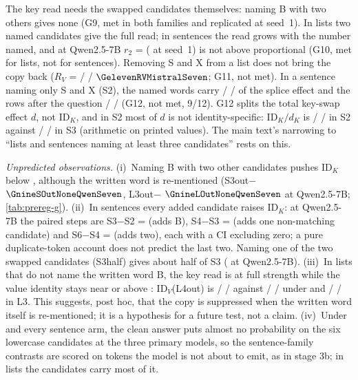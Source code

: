 The key read needs the swapped candidates themselves: naming B with two others gives none (G9, met in both families and replicated at seed~1). In lists two named candidates give the full read; in sentences the read grows with the number named, and at Qwen2.5-7B $r_2$ = \GtenSRtwoQwenSeven{} (\GtenSRtwoSeedoneQwenSeven{} at seed~1) is not above proportional (G10, met for lists, not for sentences). Removing S and X from a list does not bring the copy back ($R_V$ = \GelevenRVQwenSeven{} / \GelevenRVQwenFourteen{} / $\GelevenRVMistralSeven$; G11, not met). In a sentence naming only S and X (S2), the named words carry \GtwelveStwoQwenSeven{} / \GtwelveStwoQwenFourteen{} / \GtwelveStwoMistralSeven{} of the splice effect and the rows after the question \GtwelveRestStwoQwenSeven{} / \GtwelveRestStwoQwenFourteen{} / \GtwelveRestStwoMistralSeven{} (G12, not met, 9/12). G12 splits the total key-swap effect $d$, not $\mathrm{ID}_K$, and in S2 most of $d$ is not identity-specific: $\mathrm{ID}_K/d_K$ is \GcShareStwoQwenSeven{} / \GcShareStwoQwenFourteen{} / \GcShareStwoMistralSeven{} in S2 against \GcShareSthreeQwenSeven{} / \GcShareSthreeQwenFourteen{} / \GcShareSthreeMistralSeven{} in S3 (arithmetic on printed values). The main text's narrowing to ``lists and sentences naming at least three candidates'' rests on this.

\emph{Unpredicted observations.} (i)~Naming B with two other candidates pushes $\mathrm{ID}_K$ below \fmtNone{}, although the written word is re-mentioned (S3out$-$\fmtNone{} $\GnineSOutNoneQwenSeven$, L3out$-$\fmtNone{} $\GnineLOutNoneQwenSeven$ at Qwen2.5-7B; \cref{tab:prereg-g}). (ii)~In sentences every added candidate raises $\mathrm{ID}_K$: at Qwen2.5-7B the paired steps are S3$-$S2 = \GtenSStepThreeTwoQwenSeven{} (adds B), S4$-$S3 = \GtenSStepFourThreeQwenSeven{} (adds one non-matching candidate) and S6$-$S4 = \GtenSStepSixFourQwenSeven{} (adds two), each with a CI excluding zero; a pure duplicate-token account does not predict the last two. Naming one of the two swapped candidates (S3half) gives about half of S3 (\GcHalfQwenSeven{} at Qwen2.5-7B). (iii)~In lists that do not name the written word B, the key read is at full strength while the value identity stays near or above \fmtNone{}: $\mathrm{ID}_V$(L4out) is \GcIDVLfouroutQwenSeven{} / \GcIDVLfouroutQwenFourteen{} / \GcIDVLfouroutMistralSeven{} against \GcIDVNoneQwenSeven{} / \GcIDVNoneQwenFourteen{} / \GcIDVNoneMistralSeven{} under \fmtNone{} and \GcIDVLthreeQwenSeven{} / \GcIDVLthreeQwenFourteen{} / \GcIDVLthreeMistralSeven{} in L3. This suggests, post hoc, that the copy is suppressed when the written word itself is re-mentioned; it is a hypothesis for a future test, not a claim. (iv)~Under \fmtNone{} and every sentence arm, the clean answer puts almost no probability on the six lowercase candidates at the three primary models, so the sentence-family contrasts are scored on tokens the model is not about to emit, as in stage 3b; in lists the candidates carry most of it.

